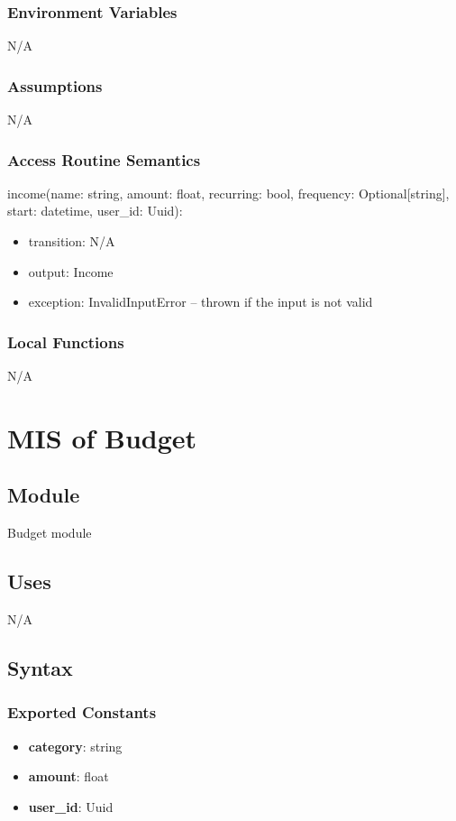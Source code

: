 \documentclass[12pt, titlepage]{article}
\begin{document}
\subsubsection{Environment Variables}
N/A

\subsubsection{Assumptions}
N/A

\subsubsection{Access Routine Semantics}

\noindent income(name: string, amount: float, recurring: bool, frequency:
Optional[string], start: datetime, user\_id: Uuid):
\begin{itemize}
\item transition: N/A
\item output: Income
\item exception: InvalidInputError -- thrown if the input is not valid
\end{itemize}

\subsubsection{Local Functions}
N/A

\newpage

\section{MIS of Budget}\label{budget_module}

\subsection{Module}

Budget module

\subsection{Uses}
N/A

\subsection{Syntax}

\subsubsection{Exported Constants}
\begin{itemize}
  \item \textbf{category}: string
  \item \textbf{amount}: float
  \item \textbf{user\_id}: Uuid
\end{itemize}
\end{document}
